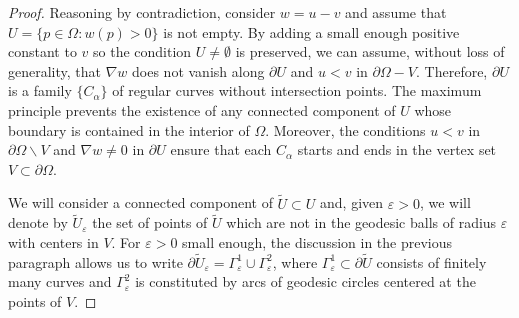 \documentclass[a4paper,10pt,reqno]{amsart}
\newcommand{\sm}{-}
\theoremstyle{definition}
\theoremstyle{remark}
\numberwithin{equation}{section}
\begin{document}
\begin{proof}
Reasoning by contradiction, consider $w=u-v$ and assume that $ U=\{p\in\Omega:w(p)>0\}$ is not empty. By adding a small enough positive constant to $v$ so the condition $ U\neq\emptyset$ is preserved, we can assume, without loss of generality, that $\nabla w$ does not vanish along $\partial U$ and $u<v$ in $\partial\Omega\sm V$. Therefore, $\partial U$ is a family $\{C_\alpha\}$ of regular curves without intersection points. The maximum principle prevents the existence of any connected component of $U$ whose boundary is contained in the interior of $\Omega$. Moreover, the conditions $u<v$ in $\partial\Omega\smallsetminus V$ and $\nabla w\neq 0$ in $\partial U$ ensure that each $C_\alpha$ starts and ends in the vertex set $V\subset \partial\Omega$.

We will consider a connected component of $\widetilde{U}\subset U$ and, given $\varepsilon>0$, we will denote by $\widetilde{U}_\varepsilon$ the set of points of $\widetilde{U}$ which are not in the geodesic balls of radius $\varepsilon$ with centers in $V$. For $\varepsilon>0$ small enough, the discussion in the previous paragraph allows us to write $\partial\widetilde{U}_\varepsilon=\Gamma^1_\varepsilon\cup \Gamma^2_\varepsilon$, where $\Gamma^1_\varepsilon\subset \partial\widetilde{U}$ consists of finitely many curves and $\Gamma^2_\varepsilon$ is constituted by arcs of geodesic circles centered at the points of $V$.


\end{proof}
\end{document}
